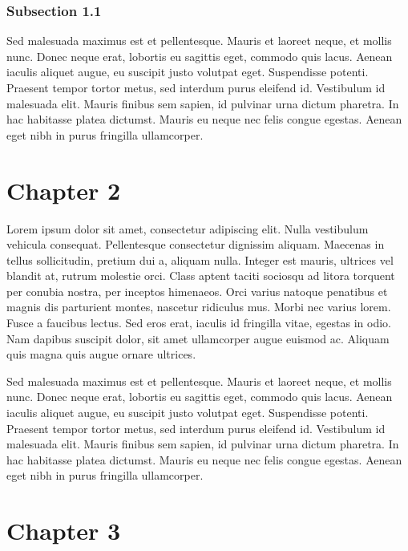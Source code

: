 \documentclass[
  12pt,
  letterpaper,
  oneside,
  open=any]{scrbook}
\begin{document}
\hypertarget{subsection-1.1}{%
\subsection{Subsection 1.1}\label{subsection-1.1}}

Sed malesuada maximus est et pellentesque. Mauris et laoreet neque, et
mollis nunc. Donec neque erat, lobortis eu sagittis eget, commodo quis
lacus. Aenean iaculis aliquet augue, eu suscipit justo volutpat eget.
Suspendisse potenti. Praesent tempor tortor metus, sed interdum purus
eleifend id. Vestibulum id malesuada elit. Mauris finibus sem sapien, id
pulvinar urna dictum pharetra. In hac habitasse platea dictumst. Mauris
eu neque nec felis congue egestas. Aenean eget nibh in purus fringilla
ullamcorper.


\hypertarget{chapter-2}{%
\chapter{Chapter 2}\label{chapter-2}}

Lorem ipsum dolor sit amet, consectetur adipiscing elit. Nulla
vestibulum vehicula consequat. Pellentesque consectetur dignissim
aliquam. Maecenas in tellus sollicitudin, pretium dui a, aliquam nulla.
Integer est mauris, ultrices vel blandit at, rutrum molestie orci. Class
aptent taciti sociosqu ad litora torquent per conubia nostra, per
inceptos himenaeos. Orci varius natoque penatibus et magnis dis
parturient montes, nascetur ridiculus mus. Morbi nec varius lorem. Fusce
a faucibus lectus. Sed eros erat, iaculis id fringilla vitae, egestas in
odio. Nam dapibus suscipit dolor, sit amet ullamcorper augue euismod ac.
Aliquam quis magna quis augue ornare ultrices.

Sed malesuada maximus est et pellentesque. Mauris et laoreet neque, et
mollis nunc. Donec neque erat, lobortis eu sagittis eget, commodo quis
lacus. Aenean iaculis aliquet augue, eu suscipit justo volutpat eget.
Suspendisse potenti. Praesent tempor tortor metus, sed interdum purus
eleifend id. Vestibulum id malesuada elit. Mauris finibus sem sapien, id
pulvinar urna dictum pharetra. In hac habitasse platea dictumst. Mauris
eu neque nec felis congue egestas. Aenean eget nibh in purus fringilla
ullamcorper.


\hypertarget{chapter-3}{%
\chapter{Chapter 3}\label{chapter-3}}
\end{document}
